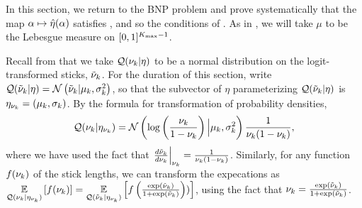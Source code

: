 In this section, we return to the BNP problem and prove systematically that the
map $\alpha \mapsto \hat\eta(\alpha)$ satisfies , and so the conditions of .  As in
, we will take $\mu$ to be the Lebesgue measure on
$[0,1]^{{K_{\mathrm{max}}} - 1}$.

Recall from  that we take $\mathcal{Q}(\nu_{k} \vert \eta)$ to be a normal
distribution on the logit-transformed sticks, $\tilde{\nu}_k$.  For the duration of
this section, write $\mathcal{Q}(\tilde{\nu}_{k} \vert \eta) = \mathcal{N}\left(\tilde{\nu}_{k} \vert \mu_k,
\sigma^2_k\right)$, so that the subvector of $\eta$ parameterizing $\mathcal{Q}(\tilde{\nu}_{k} \vert
\eta)$ is $\eta_{\nu_{k}} = (\mu_k, \sigma_k)$.
%
By the formula for transformation of probability densities,
%
\begin{align*}
%
\q(\nuk \vert \etanuk) =
    \normdist{\log\left(\frac{\nu_\k}{1 - \nu_\k} \right)
        \Big\vert  \mu_\k, \sigma^2_\k}
    \frac{1}{\nuk (1 - \nuk)},
%
\end{align*}
%
where we have used the fact that $\left.\frac{d \tilde{\nu}_k}{ d\nu_{k}}\right\vert_{\nu_{k}} =
\frac{1}{\nu_{k} (1 - \nu_{k})}$.  Similarly, for any function $f(\nu_{k})$ of the stick
lengths, we can transform the expecations as $\underset{\mathcal{Q}(\nu_{k} \vert
\eta_{\nu_{k}})}{\mathbb{E}}\left[f(\nu_{k})\right] = \underset{\mathcal{Q}(\tilde{\nu}_{k} \vert \eta_{\nu_{k}})}{\mathbb{E}}\left[f\left(
\frac{\exp(\tilde{\nu}_{k})}{1 + \exp(\tilde{\nu}_{k})}  \right))\right]$, using the fact that
$\nu_{k} = \frac{\exp(\tilde{\nu}_{k})}{1 + \exp(\tilde{\nu}_{k})}$.

